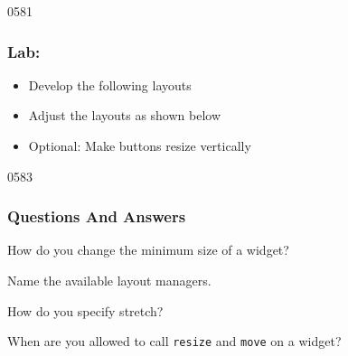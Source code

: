 \begin{slide}{0581}\frametitle{Lab: }
  \label{stretching}  
  \begin{itemize}
  \item Develop the following layouts
  \item Adjust the layouts as shown below
  \item Optional: Make buttons resize vertically
  \end{itemize}
\end{slide}


\begin{slide}{0583}\frametitle{Questions And Answers}\label{layoutQuestions}
  \begin{questionize}
  \item How do you change the minimum size of a widget?
  \item Name the available layout managers.
  \item How do you specify stretch?
  \item When are you allowed to call \texttt{resize} and \texttt{move} on a
    widget?
  \end{questionize}
\end{slide}
